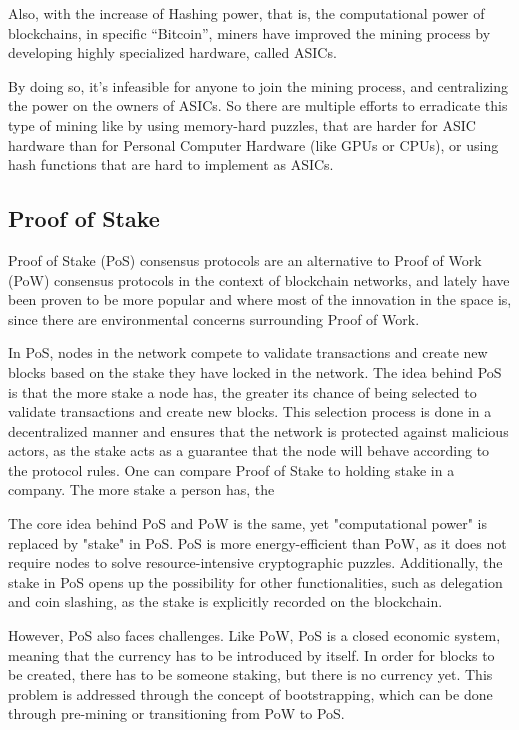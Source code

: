 Also, with the increase of Hashing power, that is, the computational power of blockchains, in specific ``Bitcoin'', miners have improved the mining process by developing highly specialized hardware, called ASICs.

By doing so, it's infeasible for anyone to join the mining process, and centralizing the power on the owners of ASICs. So there are multiple efforts to erradicate this type of mining like by using memory-hard puzzles, that are harder for ASIC hardware than for Personal Computer Hardware (like GPUs or CPUs), or using hash functions that are hard to implement as ASICs.

\subsection*{\textbf{Proof of Stake}}
Proof of Stake (PoS) consensus protocols are an alternative to Proof of Work (PoW) consensus protocols in the context of blockchain networks, and lately have been proven to be more popular and where most of the innovation in the space is, since there are environmental concerns surrounding Proof of Work.

In PoS, nodes in the network compete to validate transactions and create new blocks based on the stake they have locked in the network.
The idea behind PoS is that the more stake a node has, the greater its chance of being selected to validate transactions and create new blocks. This selection process is done in a decentralized manner and ensures that the network is protected against malicious actors, as the stake acts as a guarantee that the node will behave according to the protocol rules.
One can compare Proof of Stake to holding stake in a company. The more stake a person has, the 

The core idea behind PoS and PoW is the same, yet "computational power" is replaced by "stake" in PoS. PoS is more energy-efficient than PoW, as it does not require nodes to solve resource-intensive cryptographic puzzles. Additionally, the stake in PoS opens up the possibility for other functionalities, such as delegation and coin slashing, as the stake is explicitly recorded on the blockchain.

However, PoS also faces challenges. Like PoW, PoS is a closed economic system, meaning that the currency has to be introduced by itself. In order for blocks to be created, there has to be someone staking, but there is no currency yet. This problem is addressed through the concept of bootstrapping, which can be done through pre-mining or transitioning from PoW to PoS.


